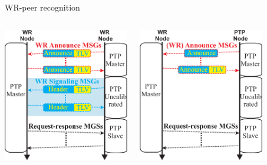 \documentclass[compress,red]{beamer}
\begin{document}
\begin{frame}{WR-peer recognition}

  \begin{columns}[c]

    \begin{center}
    \includegraphics[width=5.5cm]{protocol/WR-peer_recognision-1.pdf}
    \end{center}


    \begin{center}
    \includegraphics[width=5.5cm]{protocol/WR-peer_recognision-2.pdf}
    \end{center}

  \end{columns}

\end{frame}
\end{document}
